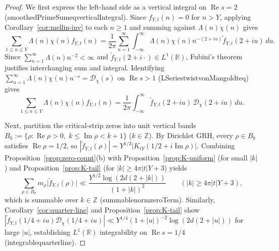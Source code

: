 \documentclass[11pt,reqno]{amsart}
\numberwithin{equation}{section}
\theoremstyle{definition}
\newcommand{\R}{\mathbb{R}}
\newcommand{\Z}{\mathbb{Z}}
\newcommand{\1}{\mathbf{1}}
\newcommand{\D}{\mathcal{D}}
\renewcommand{\Re}{\operatorname{Re}}
\renewcommand{\Im}{\operatorname{Im}}
\newcommand{\lean}[1]{{\footnotesize\ttfamily\renewcommand{\_}{\textunderscore\allowbreak}#1}}
\newcommand{\GRH}{\textup{GRH}}
\begin{document}
\begin{proof}
We first express the left-hand side as a vertical integral on $\Re s = 2$ (\lean{smoothedPrimeSum\_eq\_verticalIntegral}). Since $f_{Y,t}(n) = 0$ for $n > Y$, applying Corollary~\ref{cor:mellin-inv} to each $n \ge 1$ and summing against $\Lambda(n)\chi(n)$ gives
\[
  \sum_{1 \le n \le Y} \Lambda(n)\chi(n) f_{Y,t}(n)
  = \frac{1}{2\pi} \sum_{n=1}^\infty \int_{-\infty}^\infty \Lambda(n)\chi(n) n^{-(2+iu)} \widetilde{f}_{Y,t}(2+iu)\,du.
\]
Since $\sum_{n=1}^\infty \Lambda(n) n^{-2} < \infty$ and $\widetilde{f}_{Y,t}(2+i\cdot) \in L^1(\R)$, Fubini's theorem justifies interchanging sum and integral. Identifying $\sum_{n=1}^\infty \Lambda(n)\chi(n) n^{-s} = \D_\chi(s)$ on $\Re s > 1$ (\lean{LSeries\_twist\_vonMangoldt\_eq}) gives
\begin{equation}\label{eq:line-2}
  \sum_{1 \le n \le Y} \Lambda(n)\chi(n) f_{Y,t}(n)
  = \frac{1}{2\pi} \int_{-\infty}^\infty \widetilde{f}_{Y,t}(2+iu)\, \D_\chi(2+iu)\,du.
\end{equation}

Next, partition the critical-strip zeros into unit vertical bands $B_k := \{\rho : \Re \rho > 0,\; k \le \Im \rho < k+1\}$ ($k \in \Z$). By Dirichlet \GRH{}, every $\rho \in B_k$ satisfies $\Re \rho = 1/2$, so $|\widetilde{f}_{Y,t}(\rho)| = Y^{1/2}|K_{tY}(1/2+i\Im \rho)|$. Combining Proposition~\ref{prop:zero-count}(b) with Proposition~\ref{prop:K-uniform} (for small $|k|$) and Proposition~\ref{prop:K-tail} (for $|k| \ge 4\pi|t|Y + 3$) yields
\[
  \sum_{\rho \in B_k} m_\rho \bigl|\widetilde{f}_{Y,t}(\rho)\bigr|
  \ll \frac{Y^{1/2} \log(2d(2+|k|))}{(1+|k|)^2} \qquad (|k| \ge 4\pi|t|Y + 3),
\]
which is summable over $k \in \Z$ (\lean{summable\_norm\_zeroTerm}). Similarly, Corollary~\ref{cor:quarter-line} and Proposition~\ref{prop:K-tail} show $|\widetilde{f}_{Y,t}(1/4+iu)\D_\chi(1/4+iu)| \ll Y^{1/4}(1+|u|)^{-2}\log(2d(2+|u|))$ for large $|u|$, establishing $L^1(\R)$ integrability on $\Re s = 1/4$ (\lean{integrable\_quarter\_line}).


\end{proof}
\end{document}
